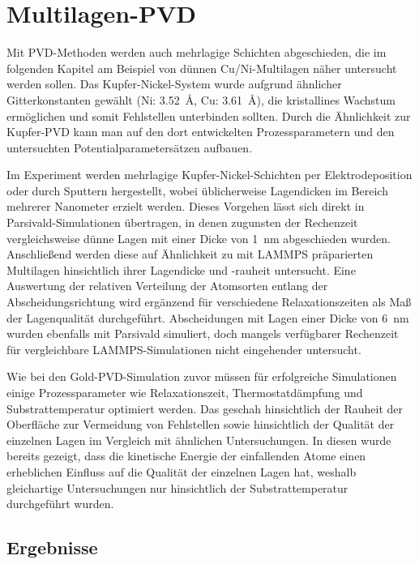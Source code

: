 \section{Multilagen-PVD}
\label{multilayer}

Mit PVD-Methoden werden auch mehrlagige Schichten abgeschieden, die im folgenden Kapitel am Beispiel von dünnen Cu/Ni-Multilagen näher untersucht werden sollen.
Das Kupfer-Nickel-System wurde aufgrund ähnlicher Gitterkonstanten gewählt (Ni: \SI{3.52}{\angstrom}, Cu: \SI{3.61}{\angstrom}), die kristallines Wachstum ermöglichen und somit Fehlstellen unterbinden sollten.
Durch die Ähnlichkeit zur Kupfer-PVD kann man auf den dort entwickelten Prozessparametern und den untersuchten Potentialparametersätzen aufbauen.

Im Experiment werden mehrlagige Kupfer-Nickel-Schichten per Elektro\-deposition\cite{yang_pulsed_1995} oder durch Sputtern\cite{cammarata_nanoindentation_1990} hergestellt, wobei üblicherweise Lagendicken im Bereich mehrerer Nanometer erzielt werden.
Dieses Vorgehen lässt sich direkt in Parsivald-Simulationen übertragen, in denen zugunsten der Rechenzeit vergleichsweise dünne Lagen mit einer Dicke von \SI{1}{\nano\meter} abgeschieden wurden.
Anschließend werden diese auf Ähnlichkeit zu mit LAMMPS präparierten Multilagen hinsichtlich ihrer Lagendicke und -rauheit untersucht.
Eine Auswertung der relativen Verteilung der Atomsorten entlang der Abscheidungsrichtung wird ergänzend für verschiedene Relaxationszeiten als Maß der Lagenqualität durchgeführt.
Abscheidungen mit Lagen einer Dicke von \SI{6}{\nano\meter} wurden ebenfalls mit Parsivald simuliert, doch mangels verfügbarer Rechenzeit für vergleichbare LAMMPS-Simulationen nicht eingehender untersucht.

Wie bei den Gold-PVD-Simulation zuvor müssen für erfolgreiche Simulationen einige Prozessparameter wie Relaxationszeit, Thermostatdämpfung und Substrattemperatur optimiert werden.
Das geschah hinsichtlich der Rauheit der Oberfläche zur Vermeidung von Fehlstellen sowie hinsichtlich der Qualität der einzelnen Lagen im Vergleich mit ähnlichen Untersuchungen\cite{zhou_atomistic_1998}.
In diesen wurde bereits gezeigt, dass die kinetische Energie der einfallenden Atome einen erheblichen Einfluss auf die Qualität der einzelnen Lagen hat, weshalb gleichartige Untersuchungen nur hinsichtlich der Substrattemperatur durchgeführt wurden.

\subsection{Ergebnisse}

